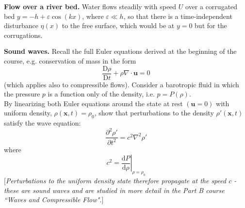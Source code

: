 \documentclass[answers]{exam}
\begin{document}
\begin{questions}



\question%
\textbf{Flow over a river bed.} Water flows steadily with speed $U$ over a corrugated bed $y=-h+\varepsilon \cos (k x)$, where $\varepsilon \ll h$, so that there is a time-independent disturbance $\eta(x)$ to the free surface, which would be at $y=0$ but for the corrugations.



\question%
\textbf{Sound waves.} Recall the full Euler equations derived at the beginning of the course, e.g. conservation of mass in the form \[
	\frac{\mathrm{D} \rho}{\mathrm{D} t}+\rho \nabla \cdot \mathbf{u}=0
\] (which applies also to compressible flows). Consider a barotropic fluid in which the pressure $p$ is a function only of the density, i.e. $p=P(\rho)$.\\ By linearizing both Euler equations around the state at rest $(\mathbf{u}=0)$ with uniform density, $\rho(\mathbf{x}, t)=\rho_{0}$, show that perturbations to the density $\rho'(\mathbf{x}, t)$ satisfy the wave equation: \[
	\frac{\partial^{2} \rho'}{\partial t^{2}}=c^{2} \nabla^{2} \rho'
\] where \[
	c^{2}=\left.\frac{\mathrm{d} P}{\mathrm{d} \rho}\right|_{\rho=\rho_{0}}
\] [\emph{Perturbations to the uniform density state therefore propagate at the speed $c$ - these are sound waves and are studied in more detail in the Part B course ``Waves and Compressible Flow".}]

\end{questions}
\end{document}
